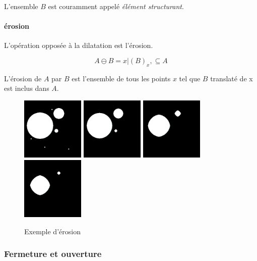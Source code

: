 L'ensemble $B$ est couramment appelé \emph{élément structurant}.

\paragraph{érosion}

L'opération opposée à la dilatation est l'érosion.

\begin{equation}
  A \ominus B = {x|(B)_x, \subseteq A}
\end{equation}

L'érosion de $A$ par $B$ est l'ensemble de tous les points $x$ tel que $B$ translaté de x est inclus dans $A$. 

\begin{figure}
  \centering
  \includegraphics[height=3cm]{Images/morpho_init.png}
  \includegraphics[height=3cm]{Images/morpho_erode_k5.png}
  \includegraphics[height=3cm]{Images/morpho_erode_k21.png}
  \includegraphics[height=3cm]{Images/morpho_erode_k31.png}
  \label{fig:morpho_erosion}
  \caption{Exemple d'érosion}
\end{figure}

\subsubsection{Fermeture et ouverture}

